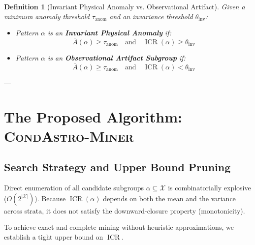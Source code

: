 \documentclass[10pt,a4paper]{article}
\newtheorem{definition}{Definition}
\begin{document}
\begin{definition}[Invariant Physical Anomaly vs. Observational Artifact]
Given a minimum anomaly threshold $\tau_{\text{anom}}$ and an invariance threshold $\theta_{\text{inv}}$:
\begin{itemize}
    \item Pattern $\alpha$ is an \textbf{Invariant Physical Anomaly} if:
    \begin{equation}
        \bar{A}(\alpha) \ge \tau_{\text{anom}} \quad \text{and} \quad \operatorname{ICR}(\alpha) \ge \theta_{\text{inv}}
    \end{equation}
    \item Pattern $\alpha$ is an \textbf{Observational Artifact Subgroup} if:
    \begin{equation}
        \bar{A}(\alpha) \ge \tau_{\text{anom}} \quad \text{and} \quad \operatorname{ICR}(\alpha) < \theta_{\text{inv}}
    \end{equation}
\end{itemize}
\end{definition}

---

\section{The Proposed Algorithm: \textsc{CondAstro-Miner}}
\label{sec:algorithm}

\subsection{Search Strategy and Upper Bound Pruning}
Direct enumeration of all candidate subgroups $\alpha \subseteq \mathcal{X}$ is combinatorially explosive ($O(2^{|\mathcal{X}|})$). Because $\operatorname{ICR}(\alpha)$ depends on both the mean and the variance across strata, it does not satisfy the downward-closure property (monotonicity).

To achieve exact and complete mining without heuristic approximations, we establish a tight upper bound on $\operatorname{ICR}$.
\end{document}
